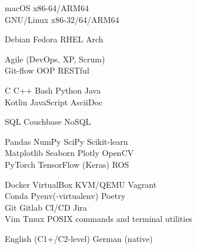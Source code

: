 \documentclass[a4paper]{./src/resume-cv}
\begin{document}
\begin{minipage}[t]{0.42\textwidth}
	\faApple\space\space macOS x86-64/ARM64\\
	\faLinux\space GNU/Linux x86-32/64/ARM64
	\subsectionsep

	Debian \bulletsep Fedora \bulletsep RHEL \bulletsep Arch
	\subsectionsep
	
	Agile (DevOps, XP, Scrum)\\
	Git-flow \bulletsep OOP \bulletsep RESTful
	\subsectionsep

	C \bulletsep C++ \bulletsep Bash \bulletsep Python \bulletsep Java \\
	Kotlin \bulletsep JavaScript \bulletsep AsciiDoc \bulletsep \latex
	\subsectionsep
	
	SQL \bulletsep Couchbase NoSQL
	\subsectionsep

	Pandas \bulletsep NumPy \bulletsep SciPy \bulletsep Scikit-learn\\
	Matplotlib \bulletsep Seaborn \bulletsep Plotly \bulletsep OpenCV\\
	PyTorch \bulletsep TensorFlow (Keras) \bulletsep ROS
	\subsectionsep

	Docker \bulletsep VirtualBox \bulletsep KVM/QEMU \bulletsep Vagrant\\
	Conda \bulletsep Pyenv(-virtualenv) \bulletsep Poetry\\
	Git \bulletsep Gitlab CI/CD \bulletsep Jira \\
	Vim \bulletsep Tmux \bulletsep POSIX commands and terminal utilities\\
	
	\subsectionsep
	
	English (C1+/C2-level) \bulletsep German (native)

\end{minipage}\quad %
\hfill %
\end{document}
